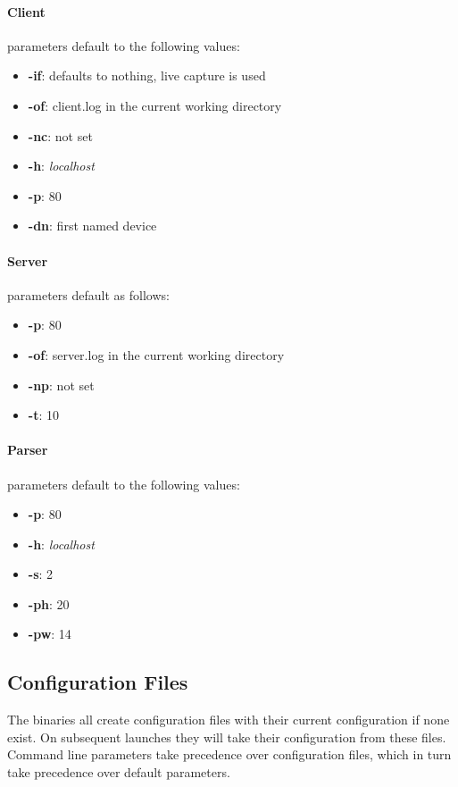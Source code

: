 \paragraph{Client} parameters default to the following values:
\begin{itemize}
    \item \textbf{-if}: defaults to nothing, live capture is used
    \item \textbf{-of}: client.log in the current working directory
    \item \textbf{-nc}: not set
    \item \textbf{-h}: \textit{localhost}
    \item \textbf{-p}: 80
    \item \textbf{-dn}: first named device
\end{itemize}

\paragraph{Server} parameters default as follows:
\begin{itemize}
    \item \textbf{-p}: 80
    \item \textbf{-of}: server.log in the current working directory
    \item \textbf{-np}: not set
    \item \textbf{-t}: 10
\end{itemize}

\paragraph{Parser} parameters default to the following values:
\begin{itemize}
    \item \textbf{-p}: 80
    \item \textbf{-h}: \textit{localhost}
    \item \textbf{-s}: 2
    \item \textbf{-ph}: 20
    \item \textbf{-pw}: 14
\end{itemize}

\subsection*{Configuration Files}
The binaries all create configuration files with their current configuration if none exist.
On subsequent launches they will take their configuration from these files.
Command line parameters take precedence over configuration files, which in turn take precedence over default parameters.
